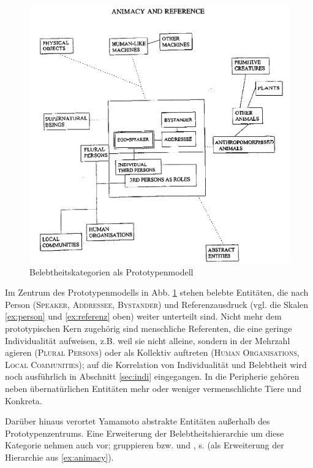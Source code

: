 \begin{figure}[h]
\begin{center}
\includegraphics[width=12cm]{images/yamamoto2.jpg}
\caption {Belebtheitskategorien als Prototypenmodell \parencite[aus][38]{Yamamoto1999}}
\label{yamamoto}
\end{center}
\end{figure} 


Im Zentrum des Prototypenmodells in Abb. \ref{yamamoto} stehen belebte Entitäten, die nach Person (\textsc{Speaker, Addressee, Bystander}) und Referenzausdruck (vgl. die Skalen \ref{ex:person}  und \ref{ex:referenz} oben) weiter unterteilt sind. Nicht mehr dem prototypischen Kern zugehörig sind menschliche Referenten, die eine geringe Individualität aufweisen, z.B. weil sie nicht alleine, sondern in der Mehrzahl agieren (\textsc{Plural Persons}) oder als Kollektiv auftreten (\textsc{Human Organisations, Local Communities}); auf die Korrelation von Individualität und Belebtheit wird noch ausführlich in Abschnitt \ref{sec:indi} eingegangen. In die Peripherie gehören neben übernatürlichen Entitäten mehr oder weniger vermenschlichte Tiere und Konkreta.  

Darüber hinaus verortet Yamamoto abstrakte Entitäten außerhalb des Prototypenzentrums. Eine Erweiterung der Belebtheitshierarchie um diese Kategorie nehmen auch \textcite{Allan1987,Langacker1991,Croft1995} vor; \textcite[194]{Enger2011} gruppieren  bzw.  und , s.  (als Erweiterung der Hierarchie aus \ref{ex:animacy}).

